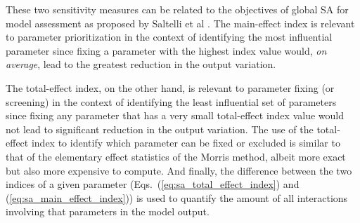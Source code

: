 These two sensitivity measures can be related to the objectives of global SA for model assessment as proposed by Saltelli et al \cite{Saltelli2004,Saltelli2008}.
The main-effect index is relevant to parameter prioritization in the context of identifying the most influential parameter 
since fixing a parameter with the highest index value would, \emph{on average}, lead to 
the greatest reduction in the output variation.

The total-effect index, on the other hand, is relevant to parameter fixing (or screening) in the context of identifying the least influential set of parameters since fixing any parameter that has a very small 
total-effect index value would not lead to significant reduction in the output variation.
The use of the total-effect index to identify which parameter can be fixed or excluded is similar to that of the elementary effect statistics of the Morris method, 
albeit more exact but also more expensive to compute.
And finally, the difference between the two indices of a given parameter (Eqs.~(\ref{eq:sa_total_effect_index}) and (\ref{eq:sa_main_effect_index})) is used to quantify the amount of all interactions involving that parameters in the model output.
